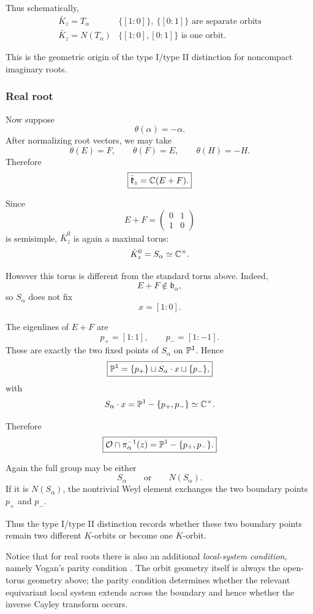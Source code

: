 Thus schematically,
\[
\begin{array}{c|c}
\bar K_z=T_\alpha
&
\{[1:0]\},\ \{[0:1]\}\text{ are separate orbits}
\\
\bar K_z=N(T_\alpha)
&
\{[1:0],[0:1]\}\text{ is one orbit}.
\end{array}
\]

This is the geometric origin of the type I/type II distinction for
noncompact imaginary roots.

\subsubsection*{Real root}

Now suppose
\[
\theta(\alpha)=-\alpha.
\]
After normalizing root vectors, we may take
\[
\theta(E)=F,\qquad
\theta(F)=E,\qquad
\theta(H)=-H.
\]
Therefore
\[
\boxed{
\bar{\mathfrak k}_z
=
\mathbb{C}(E+F).
}
\]

Since
\[
E+F
=
\begin{pmatrix}
0&1\\
1&0
\end{pmatrix}
\]
is semisimple, $\bar K_z^0$ is again a maximal torus:
\[
\bar K_z^0=S_\alpha\simeq\mathbb{C}^\times.
\]

However this torus is different from the standard torus above. Indeed,
\[
E+F\notin\mathfrak b_\alpha,
\]
so $S_\alpha$ does not fix
\[
x=[1:0].
\]

The eigenlines of $E+F$ are
\[
p_+=[1:1],
\qquad
p_-=[1:-1].
\]
These are exactly the two fixed points of $S_\alpha$ on $\mathbb{P}^1$.
Hence
\[
\boxed{
\mathbb{P}^1
=
\{p_+\}
\sqcup
S_\alpha\cdot x
\sqcup
\{p_-\},
}
\]
with
\[
S_\alpha\cdot x
=
\mathbb{P}^1-\{p_+,p_-\}
\simeq\mathbb{C}^\times.
\]

Therefore
\[
\boxed{
\mathcal{O}\cap\pi_\alpha^{-1}(z)
=
\mathbb{P}^1-\{p_+,p_-\}.
}
\]

Again the full group may be either
\[
S_\alpha
\qquad\text{or}\qquad
N(S_\alpha).
\]
If it is $N(S_\alpha)$, the nontrivial Weyl element exchanges the two
boundary points $p_+$ and $p_-$.

Thus the type I/type II distinction records whether these two boundary
points remain two different $K$-orbits or become one $K$-orbit.

Notice that for real roots there is also an additional
\emph{local-system condition}, namely Vogan's parity condition \cite{Vogan1981}.
The orbit geometry itself is always the open-torus geometry above;
the parity condition determines whether the relevant equivariant local
system extends across the boundary and hence whether the inverse Cayley
transform occurs.

